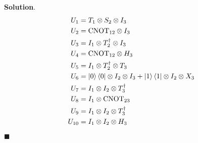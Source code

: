 \documentclass[12pt]{article}
\theoremstyle{definition}
\newenvironment{s}{%
        \begin{trivlist} \item \textbf{Solution}. }{%
            \hspace*{\fill} $\blacksquare$\end{trivlist}}%
\begin{document}
{\begin{s}
\begin{align*}
U_{1} &= T_1 \otimes S_2 \otimes I_3\\
U_{2} &= \mathrm{CNOT}_{12}\otimes I_{3}\\
U_{3} &= I_{1} \otimes T_{2}^{\dagger} \otimes I_3\\
U_{4} &= \mathrm{CNOT}_{12}\otimes H_{3}\\
U_{5} &= I_1 \otimes T_{2}^{\dagger} \otimes T_3\\
U_{6} &= \ket{0}\bra{0}\otimes I_{2}\otimes I_{3} + \ket{1}\bra{1}\otimes I_{2}\otimes X_{3}\\
U_{7} &= I_1 \otimes I_2 \otimes T_3^{\dagger}\\
U_{8} &= I_{1}\otimes \mathrm{CNOT}_{23}\\
U_{9} &= I_1 \otimes I_2 \otimes T_3^{\dagger}\\
U_{10} &= I_1 \otimes I_2 \otimes H_3
\end{align*}



\end{s}
\end{document}
